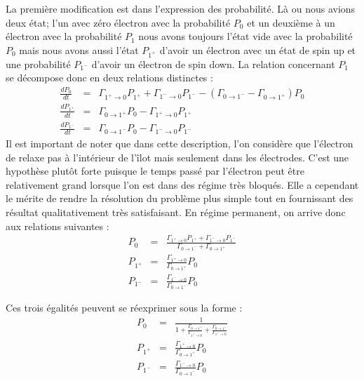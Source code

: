 La première modification est dans l'expression des probabilité. Là ou nous avions deux état; l'un avec zéro électron avec la probabilité $P_0$ et un deuxième à un électron avec la probabilité $P_1$ nous avons toujours l'état vide avec la probabilité $P_0$ mais nous avons aussi l'état $P_{1^+}$ d'avoir un électron avec un état de spin up et une probabilité $P_{1^-}$ d'avoir un électron de spin down. La relation concernant $P_1$ se décompose donc en deux relations distinctes :
\begin{eqnarray}
\frac{dP_{0}}{dt} &=& \Gamma_{1^+ \rightarrow 0}P_{1^+} + \Gamma_{1^- \rightarrow 0}P_{1^-} - (\Gamma_{0 \rightarrow 1^-} - \Gamma_{0 \rightarrow 1^+})P_0\\
\frac{dP_{1^+}}{dt} &=& \Gamma_{0 \rightarrow 1^+}P_0 - \Gamma_{1^+ \rightarrow 0}P_{1^+}\\
\frac{dP_{1^-}}{dt} &=& \Gamma_{0 \rightarrow 1^-}P_0 - \Gamma_{1^- \rightarrow 0}P_{1^-}
\end{eqnarray}
Il est important de noter que dans cette description, l'on considère que l'électron de relaxe pas à l'intérieur de l'\^ilot mais seulement dans les électrodes. C'est une hypothèse plut\^ot forte puisque le temps passé par l'électron peut \^etre relativement grand lorsque l'on est dans des régime très bloqués. Elle a cependant le mérite de rendre la résolution du problème plus simple tout en fournissant des résultat qualitativement très satisfaisant.
En régime permanent, on arrive donc aux relations suivantes :
\begin{eqnarray}
P_0 &=& \frac{\Gamma_{1^+ \rightarrow 0}P_{1^+} + \Gamma_{1^- \rightarrow 0}P_{1^-}}{\Gamma_{0 \rightarrow 1^-} + \Gamma_{0 \rightarrow 1^+} }\\
P_{1^+} &=& \frac{\Gamma_{1^+ \rightarrow 0}}{\Gamma_{0 \rightarrow 1^+}}P_0 \\
P_{1^-} &=& \frac{\Gamma_{1^- \rightarrow 0}}{\Gamma_{0 \rightarrow 1^-}}P_0
\end{eqnarray}

Ces trois égalités peuvent se réexprimer sous la forme :
\begin{eqnarray}
P_0 &=& \frac{1}{1 + \frac{\Gamma_{0 \rightarrow 1^+}}{\Gamma_{1^+ \rightarrow 0}} + \frac{\Gamma_{0 \rightarrow 1^-}}{\Gamma_{1^- \rightarrow 0}} } \\
P_{1^+} &=& \frac{\Gamma_{1^+ \rightarrow 0}}{\Gamma_{0 \rightarrow 1^+}}P_0 \\
P_{1^-} &=& \frac{\Gamma_{1^- \rightarrow 0}}{\Gamma_{0 \rightarrow 1^-}}P_0
\end{eqnarray}

